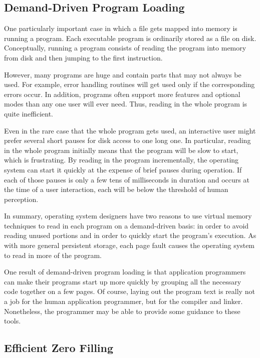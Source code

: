 \subsection{Demand-Driven Program Loading}

One particularly important case in which a file gets mapped into memory is
running a program.  Each executable program is ordinarily stored as a
file on disk.  Conceptually, running a program consists of reading the
program into memory from disk and then jumping to the first
instruction.

However, many programs are huge and contain parts that may not always
be used.  For example, error handling routines will get used only if
the corresponding errors occur.  In addition, programs often support more
features and optional modes than any one user will ever need.  Thus,
reading in the whole program is quite inefficient.

Even in the rare case that the whole program gets used, an interactive
user might prefer several short pauses for disk access to one long
one.  In particular, reading in the whole program initially means that
the program will be slow to start, which is frustrating.  By reading
in the program incrementally, the operating system can start it
quickly at the expense of brief pauses during operation.  If each of
those pauses is only a few tens of milliseconds in duration and
occurs at the time of a user interaction, each will be below the
threshold of human perception.

In summary, operating system designers have two reasons to use virtual memory
techniques to read in each program on a demand-driven basis: in order to avoid
reading unused portions and in order to quickly start the program's execution.  As with more general
persistent storage, each page fault causes the operating system to
read in more of the program.

One result of demand-driven program loading is that application programmers can make their
programs start up more quickly by grouping all the necessary code together
on a few pages. Of
course, laying out the program text is really not a job for the
human application programmer, but for the compiler and linker.
Nonetheless, the programmer may be able to provide some guidance to these tools.

\subsection{Efficient Zero Filling}

